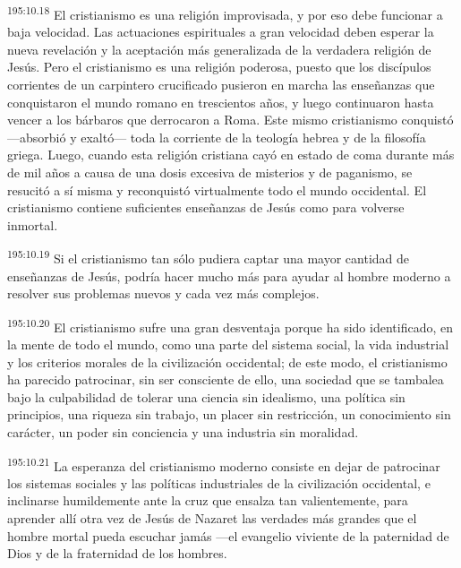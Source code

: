 \par
\textsuperscript{195:10.18} El cristianismo es una religión improvisada, y por eso debe funcionar a baja velocidad. Las actuaciones espirituales a gran velocidad deben esperar la nueva revelación y la aceptación más generalizada de la verdadera religión de Jesús. Pero el cristianismo es una religión poderosa, puesto que los discípulos corrientes de un carpintero crucificado pusieron en marcha las enseñanzas que conquistaron el mundo romano en trescientos años, y luego continuaron hasta vencer a los bárbaros que derrocaron a Roma. Este mismo cristianismo conquistó ---absorbió y exaltó--- toda la corriente de la teología hebrea y de la filosofía griega. Luego, cuando esta religión cristiana cayó en estado de coma durante más de mil años a causa de una dosis excesiva de misterios y de paganismo, se resucitó a sí misma y reconquistó virtualmente todo el mundo occidental. El cristianismo contiene suficientes enseñanzas de Jesús como para volverse inmortal.

\par
\textsuperscript{195:10.19} Si el cristianismo tan sólo pudiera captar una mayor cantidad de enseñanzas de Jesús, podría hacer mucho más para ayudar al hombre moderno a resolver sus problemas nuevos y cada vez más complejos.

\par
\textsuperscript{195:10.20} El cristianismo sufre una gran desventaja porque ha sido identificado, en la mente de todo el mundo, como una parte del sistema social, la vida industrial y los criterios morales de la civilización occidental; de este modo, el cristianismo ha parecido patrocinar, sin ser consciente de ello, una sociedad que se tambalea bajo la culpabilidad de tolerar una ciencia sin idealismo, una política sin principios, una riqueza sin trabajo, un placer sin restricción, un conocimiento sin carácter, un poder sin conciencia y una industria sin moralidad.

\par
\textsuperscript{195:10.21} La esperanza del cristianismo moderno consiste en dejar de patrocinar los sistemas sociales y las políticas industriales de la civilización occidental, e inclinarse humildemente ante la cruz que ensalza tan valientemente, para aprender allí otra vez de Jesús de Nazaret las verdades más grandes que el hombre mortal pueda escuchar jamás ---el evangelio viviente de la paternidad de Dios y de la fraternidad de los hombres.